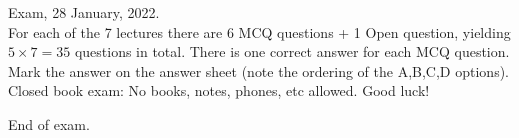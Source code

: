 \documentclass[10pt]{article}
\begin{document}
\parindent0pt

Exam, 28 January, 2022. \\

For each of the 7 lectures there are 6 MCQ questions + 1 Open question, yielding $5 \times 7 =35$ questions in total. There is one correct answer for each MCQ question. Mark the answer on the answer sheet (note the ordering of the A,B,C,D options). Closed book exam: No books, notes, phones, etc allowed. Good luck! 

\begin{flushright}

\end{flushright}

End of exam.
\end{document}
